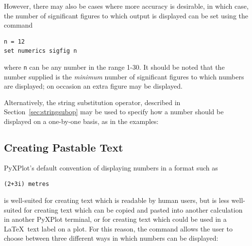 However, there may also be cases where more accuracy is desirable, in which
case, the number of significant figures to which output is displayed can be set
using the command

\begin{verbatim}
n = 12
set numerics sigfig n
\end{verbatim}

\noindent where {\tt n} can be any number in the range 1-30. It should be noted
that the number supplied is the {\it minimum} number of significant figures to
which numbers are displayed; on occasion an extra figure may be displayed.

Alternatively, the string substitution operator, described in
Section~\ref{sec:stringsubop} may be used to specify how a number should be
displayed on a one-by-one basis, as in the examples:

\vspace{3mm}
{\footnotesize
{}\newline
{}\newline
{}\newline
{}\newline
{}\newline
{}\newline
{}\newline
{}\vspace{3mm}
}


\subsection{Creating Pastable Text}
\label{sec:pastable}

PyXPlot's default convention of displaying numbers in a format such as

\begin{verbatim}
(2+3i) metres
\end{verbatim}

\noindent is well-suited for creating text which is readable by human users, but
is less well-suited for creating text which can be copied and pasted into
another calculation in another PyXPlot terminal, or for creating text which
could be used in a \LaTeX\ text label on a plot. For this reason, the
 command allows the user to choose between three
different ways in which numbers can be displayed:


